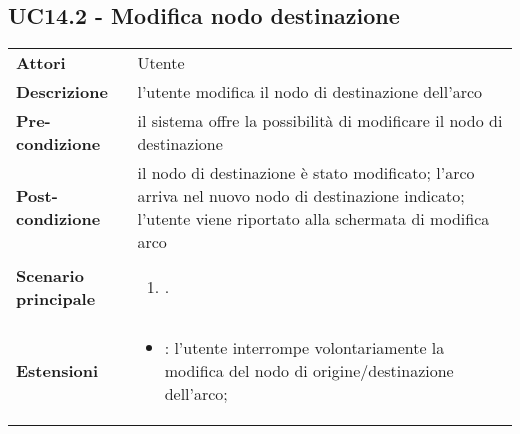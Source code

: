 \subsection{UC14.2 - Modifica nodo destinazione} 
\label{sssec:UC14.2} 
\def\arraystretch{1.5}
\begin{tabularx}{\textwidth}{l|p{}}
	\rowcolor{I} \multicolumn{2}{c}{\color{white}\textbf{UC14.2 - Modifica nodo destinazione}} \\
	\toprule
	\endhead
	\textbf{Attori} & Utente\\
	\textbf{Descrizione} & l'utente modifica il nodo di destinazione dell'arco\\
	\textbf{Pre-condizione} & il sistema offre la possibilità di modificare il nodo di destinazione\\
	\textbf{Post-condizione} & il nodo di destinazione è stato modificato; l'arco arriva nel nuovo nodo di destinazione indicato; l'utente viene riportato alla schermata di modifica arco\\
	\textbf{Scenario principale} & \vspace{-1.2em}\begin{enumerate}[leftmargin=*,noitemsep,nosep]
		\item \nameref{sssec:UC14.2}.
	\end{enumerate}\\
	\textbf{Estensioni} & \vspace{-1.2em}\begin{itemize}[leftmargin=*,noitemsep,nosep]
		\item \nameref{sssec:UC14.3}: l'utente interrompe volontariamente la modifica del nodo di
		origine/destinazione dell'arco;
	\end{itemize}\\
	\bottomrule
\end{tabularx}
